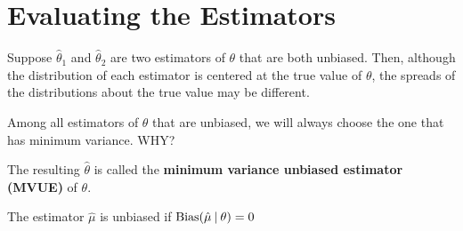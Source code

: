 \section{Evaluating the Estimators}

Suppose $\hat{\theta}_1$ and $\hat{\theta}_2$ are two estimators of $\theta$ that are both 
unbiased. Then, although the distribution of each estimator 
is centered at the true value of $\theta$, the spreads of the 
distributions about the true value may be different.

Among all estimators of $\theta$ that are unbiased, we will always 
choose the one that has minimum variance. WHY? 

The resulting $\hat{\theta}$ is called the \textbf{minimum variance unbiased 
estimator (MVUE)} of $\theta$.

\begin{definition}
    The estimator $\hat{\mu}$ is unbiased if $\operatorname*{Bias}(\hat{\mu} \> | \> \theta) = 0$
\end{definition}

